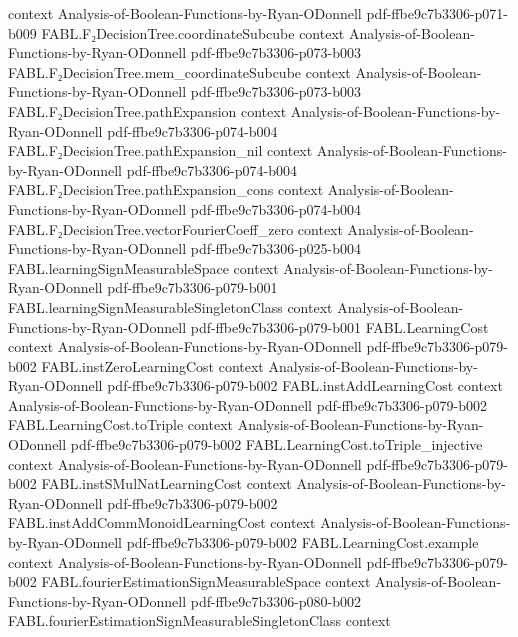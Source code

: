 \begin{theorem}
  {context}
  {Analysis-of-Boolean-Functions-by-Ryan-ODonnell}
  {pdf-ffbe9c7b3306-p071-b009}
\proofstep
  {FABL.F₂DecisionTree.coordinateSubcube}
  {context}
  {Analysis-of-Boolean-Functions-by-Ryan-ODonnell}
  {pdf-ffbe9c7b3306-p073-b003}
\proofstep
  {FABL.F₂DecisionTree.mem_coordinateSubcube}
  {context}
  {Analysis-of-Boolean-Functions-by-Ryan-ODonnell}
  {pdf-ffbe9c7b3306-p073-b003}
\proofstep
  {FABL.F₂DecisionTree.pathExpansion}
  {context}
  {Analysis-of-Boolean-Functions-by-Ryan-ODonnell}
  {pdf-ffbe9c7b3306-p074-b004}
\proofstep
  {FABL.F₂DecisionTree.pathExpansion_nil}
  {context}
  {Analysis-of-Boolean-Functions-by-Ryan-ODonnell}
  {pdf-ffbe9c7b3306-p074-b004}
\proofstep
  {FABL.F₂DecisionTree.pathExpansion_cons}
  {context}
  {Analysis-of-Boolean-Functions-by-Ryan-ODonnell}
  {pdf-ffbe9c7b3306-p074-b004}
\proofstep
  {FABL.F₂DecisionTree.vectorFourierCoeff_zero}
  {context}
  {Analysis-of-Boolean-Functions-by-Ryan-ODonnell}
  {pdf-ffbe9c7b3306-p025-b004}
\proofstep
  {FABL.learningSignMeasurableSpace}
  {context}
  {Analysis-of-Boolean-Functions-by-Ryan-ODonnell}
  {pdf-ffbe9c7b3306-p079-b001}
\proofstep
  {FABL.learningSignMeasurableSingletonClass}
  {context}
  {Analysis-of-Boolean-Functions-by-Ryan-ODonnell}
  {pdf-ffbe9c7b3306-p079-b001}
\proofstep
  {FABL.LearningCost}
  {context}
  {Analysis-of-Boolean-Functions-by-Ryan-ODonnell}
  {pdf-ffbe9c7b3306-p079-b002}
\proofstep
  {FABL.instZeroLearningCost}
  {context}
  {Analysis-of-Boolean-Functions-by-Ryan-ODonnell}
  {pdf-ffbe9c7b3306-p079-b002}
\proofstep
  {FABL.instAddLearningCost}
  {context}
  {Analysis-of-Boolean-Functions-by-Ryan-ODonnell}
  {pdf-ffbe9c7b3306-p079-b002}
\proofstep
  {FABL.LearningCost.toTriple}
  {context}
  {Analysis-of-Boolean-Functions-by-Ryan-ODonnell}
  {pdf-ffbe9c7b3306-p079-b002}
\proofstep
  {FABL.LearningCost.toTriple_injective}
  {context}
  {Analysis-of-Boolean-Functions-by-Ryan-ODonnell}
  {pdf-ffbe9c7b3306-p079-b002}
\proofstep
  {FABL.instSMulNatLearningCost}
  {context}
  {Analysis-of-Boolean-Functions-by-Ryan-ODonnell}
  {pdf-ffbe9c7b3306-p079-b002}
\proofstep
  {FABL.instAddCommMonoidLearningCost}
  {context}
  {Analysis-of-Boolean-Functions-by-Ryan-ODonnell}
  {pdf-ffbe9c7b3306-p079-b002}
\proofstep
  {FABL.LearningCost.example}
  {context}
  {Analysis-of-Boolean-Functions-by-Ryan-ODonnell}
  {pdf-ffbe9c7b3306-p079-b002}
\proofstep
  {FABL.fourierEstimationSignMeasurableSpace}
  {context}
  {Analysis-of-Boolean-Functions-by-Ryan-ODonnell}
  {pdf-ffbe9c7b3306-p080-b002}
\proofstep
  {FABL.fourierEstimationSignMeasurableSingletonClass}
  {context}

\end{theorem}
